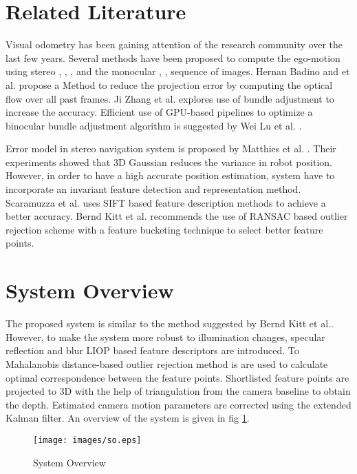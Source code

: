 \documentclass{article}
\begin{document}
\section{Related Literature}

Visual odometry has been gaining attention of the research community over the last few years. Several methods have been proposed to compute the ego-motion using stereo \cite{mandelbaum1999correlation}, \cite{mallet2000position}, \cite{Kitt2010IV}, \cite{badino2013visual} and the monocular \cite{bruss1983passive}, \cite{heeger1992subspace}, \cite{kanatani19933} \cite{wagner1999robust} sequence of images. Hernan Badino and et al. \cite{badino2013visual} propose a Method to reduce the projection error by computing the optical flow  over all past frames. Ji Zhang et al. \cite{zhang2014real} explores use of bundle adjustment to increase the accuracy. Efficient use of GPU-based pipelines to optimize a  binocular bundle adjustment algorithm is suggested by Wei Lu et al. \cite{hpvo}.

\par
Error model in stereo navigation system is proposed by Matthies et al. \cite{matthies1987error}. Their experiments showed that  3D Gaussian reduces the variance in robot position. However, in order to have a high accurate position estimation, system have to incorporate an invariant feature detection and representation method.  Scaramuzza et al. \cite{Scaramuzza2008} uses SIFT based feature description methods to achieve a better accuracy. Bernd Kitt et al. \cite{Kitt2010IV} recommends the use of RANSAC based outlier  rejection  scheme with a feature bucketing technique to select better feature points.


\section{System Overview}

The proposed system is similar to the method suggested by Bernd Kitt et al.\cite{Kitt2010IV}. However, to make the system more robust to illumination changes, specular reflection and blur   LIOP \cite{wang2011local} based  feature descriptors are introduced. To Mahalanobis distance-based outlier rejection \cite{Blanco2012} method is are used to calculate optimal correspondence between the feature points. Shortlisted feature points are projected to 3D with the help of triangulation from the camera baseline to obtain the depth. Estimated camera motion parameters are corrected using   the extended Kalman filter. An overview of the system is given in fig \ref{sv}.
\begin{figure}[ht]
 \centering
 \texttt{[image: images/so.eps]}
\caption{System Overview}
\label{sv}
\end{figure}
\end{document}
